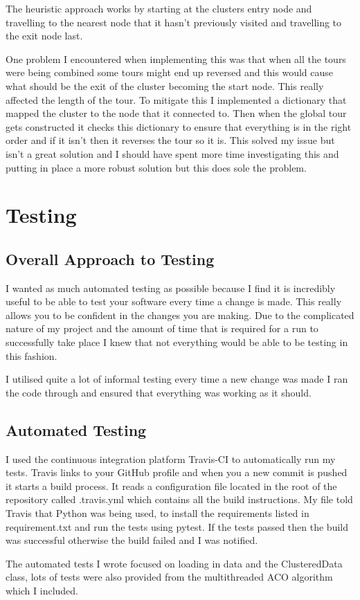 The heuristic approach works by starting at the clusters entry node and travelling to the nearest node that it hasn't previously visited and travelling to the exit node last.

One problem I encountered when implementing this was that when all the tours were being combined some tours might end up reversed and this would cause what should be the exit of the cluster becoming the start node. This really affected the length of the tour. To mitigate this I implemented a dictionary that mapped the cluster to the node that it connected to. Then when the global tour gets constructed it checks this dictionary to ensure that everything is in the right order and if it isn't then it reverses the tour so it is. This solved my issue but isn't a great solution and I should have spent more time investigating this and putting in place a more robust solution but this does sole the problem.  

\section{Testing}


\subsection{Overall Approach to Testing}

I wanted as much automated testing as possible because I find it is incredibly useful to be able to test your software every time a change is made. This really allows you to be confident in the changes you are making. Due to the complicated nature of my project and the amount of time that is required for a run to successfully take place I knew that not everything would be able to be testing in this fashion.

I utilised quite a lot of informal testing every time a new change was made I ran the code through and ensured that everything was working as it should.

\subsection{Automated Testing}

I used the continuous integration platform Travis-CI\cite{travis_ci} to automatically run my tests. Travis links to your GitHub profile and when you a new commit is pushed it starts a build process. It reads a configuration file located in the root of the repository called .travis.yml which contains all the build instructions. My file told Travis that Python was being used, to install the requirements listed in requirement.txt and run the tests using pytest. If the tests passed then the build was successful otherwise the build failed and I was notified. 

The automated tests I wrote focused on loading in data and the ClusteredData class, lots of tests were also provided from the multithreaded ACO algorithm which I included.

